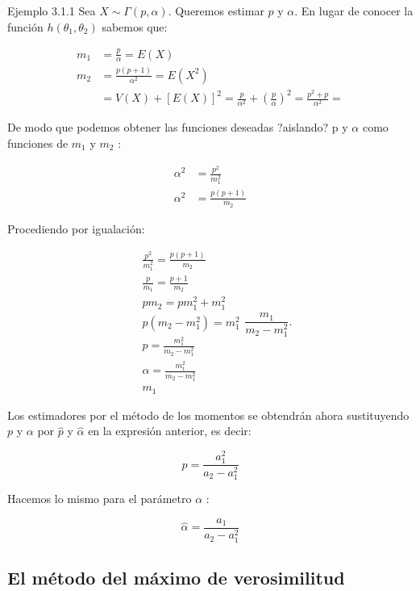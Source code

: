 \documentclass[
]{article}
\begin{document}
Ejemplo 3.1.1 Sea \(X \sim \Gamma(p, \alpha)\). Queremos estimar \(p\) y \(\alpha\). En lugar de conocer la función \(h\left(\theta_{1}, \theta_{2}\right)\) sabemos que:

\[
\begin{aligned}
m_{1} & =\frac{p}{\alpha}=E(X) \\
m_{2} & =\frac{p(p+1)}{\alpha^{2}}=E\left(X^{2}\right) \\
& =V(X)+[E(X)]^{2}=\frac{p}{\alpha^{2}}+\left(\frac{p}{\alpha}\right)^{2}=\frac{p^{2}+p}{\alpha^{2}}=
\end{aligned}
\]

De modo que podemos obtener las funciones deseadas ?aislando? p y \(\alpha\) como funciones de \(m_{1}\) y \(m_{2}\) :

\[
\begin{aligned}
\alpha^{2} & =\frac{p^{2}}{m_{1}^{2}} \\
\alpha^{2} & =\frac{p(p+1)}{m_{2}}
\end{aligned}
\]

Procediendo por igualación:

\[
\begin{aligned}
& \frac{p^{2}}{m_{1}^{2}}=\frac{p(p+1)}{m_{2}} \\
& \frac{p}{m_{1}}=\frac{p+1}{m_{2}} \\
& p m_{2}=p m_{1}^{2}+m_{1}^{2} \\
& p\left(m_{2}-m_{1}^{2}\right)=m_{1}^{2} \\
& p=\frac{m_{1}^{2}}{m_{2}-m_{1}^{2}} \\
& \alpha=\frac{m_{1}^{2}}{m_{2}-m_{1}^{2}} \\
& m_{1}
\end{aligned} \frac{m_{1}}{m_{2}-m_{1}^{2}} .
\]

Los estimadores por el método de los momentos se obtendrán ahora sustituyendo \(p\) y \(\alpha\) por \(\hat{p}\) y \(\hat{\alpha}\) en la expresión anterior, es decir:

\[
\widehat{p}=\frac{a_{1}^{2}}{a_{2}-a_{1}^{2}}
\]

Hacemos lo mismo para el parámetro \(\alpha\) :

\[
\widehat{\alpha}=\frac{a_{1}}{a_{2}-a_{1}^{2}}
\]

\subsection{El método del máximo de verosimilitud}\label{el-muxe9todo-del-muxe1ximo-de-verosimilitud}
\end{document}
